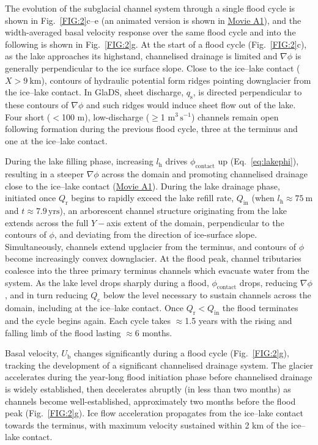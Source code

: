 \documentclass[tc, manuscript]{copernicus}
\begin{document}
The evolution of the subglacial channel system through a single flood cycle is shown in Fig.~\ref{FIG:2}c--e (an animated version is shown in \hyperref[Apfig:SuppMovie]{Movie A1}), and the width-averaged basal velocity response over the same flood cycle and into the following is shown in Fig.~\ref{FIG:2}g. At the start of a flood cycle (Fig.~\ref{FIG:2}c), as the lake approaches its highstand, channelised drainage is limited and $\nabla\phi$ is generally perpendicular to the ice surface slope. Close to the ice--lake contact ($X > \mathrm{9\ km}$), contours of hydraulic potential form ridges pointing downglacier from the ice--lake contact. In GlaDS, sheet discharge, $q_{\mathrm{s}}$, is directed perpendicular to these contours of $\nabla\phi$ and such ridges would induce sheet flow out of the lake. Four short ($<$100 m), low-discharge ($\geq$1 m$^{3}\,\mathrm{s}^{-1}$) channels remain open following formation during the previous flood cycle, three at the terminus and one at the ice--lake contact.

During the lake filling phase, increasing $l_\mathrm{{h}}$ drives $\phi_{\mathrm{contact}}$ up (Eq.~\ref{eq:lakephi}), resulting in a steeper $\nabla \phi$ across the domain and promoting channelised drainage close to the ice--lake contact (\hyperref[Apfig:SuppMovie]{Movie A1}). During the lake drainage phase, initiated once $Q_{\mathrm{r}}$ begins to rapidly exceed the lake refill rate, $Q_{\mathrm{in}}$ (when $l_\mathrm{{h}} \approx \mathrm{75\ m}$ and $t \approx \mathrm{7.9 \, yrs}$), an arborescent channel structure originating from the lake extends across the full $Y-$axis extent of the domain, perpendicular to the contours of $\phi$, and deviating from the direction of ice-surface slope. Simultaneously, channels extend upglacier from the terminus, and contours of $\phi$ become increasingly convex downglacier. At the flood peak, channel tributaries coalesce into the three primary terminus channels which evacuate water from the system. As the lake level drops sharply during a flood, $\phi_{\mathrm{contact}}$ drops, reducing $\nabla \phi$, and in turn reducing $Q_{\mathrm{c}}$ below the level necessary to sustain channels across the domain, including at the ice--lake contact. Once $Q_{\mathrm{r}} < Q_{\mathrm{in}}$ the flood terminates and the cycle begins again. Each cycle takes $\approx$1.5 years with the rising and falling limb of the flood lasting $\approx$6 months. 

Basal velocity, $U_{\mathrm{b}}$ changes significantly during a flood cycle (Fig.~\ref{FIG:2}g), tracking the development of a significant channelised drainage system. The glacier accelerates during the year-long flood initiation phase before channelised drainage is widely established, then decelerates abruptly (in less than two months) as channels become well-established, approximately two months before the flood peak (Fig.~\ref{FIG:2}g). Ice flow acceleration propagates from the ice--lake contact towards the terminus, with maximum velocity sustained within 2 km of the ice--lake contact. 
\end{document}
